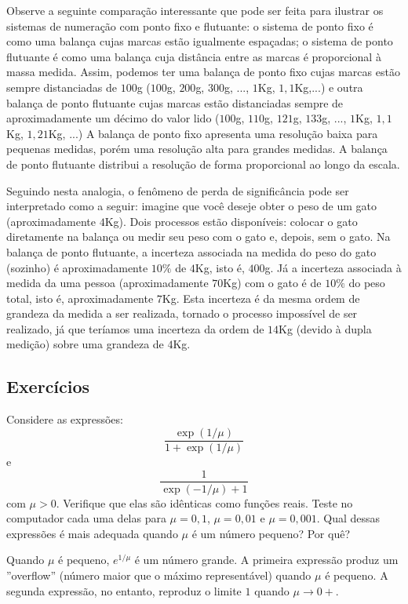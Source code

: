 \begin{ex} Observe a seguinte comparação interessante que pode ser feita para ilustrar os sistemas de numeração com ponto fixo e flutuante: o sistema de ponto fixo é como uma balança cujas marcas estão igualmente espaçadas; o sistema de ponto flutuante é como uma balança cuja distância entre as marcas é proporcional à massa medida. Assim, podemos ter uma balança de ponto fixo cujas marcas estão sempre distanciadas de $100$g ($100$g, $200$g, $300$g, ..., $1$Kg, $1,1$Kg,...) e outra balança de ponto flutuante cujas marcas estão distanciadas sempre de aproximadamente um décimo do valor lido ($100$g, $110$g, $121$g, $133$g, ..., $1$Kg, $1,1$Kg, $1,21$Kg, ...) A balança de ponto fixo apresenta uma resolução baixa para pequenas medidas, porém uma resolução alta para grandes medidas. A balança de ponto flutuante distribui a resolução de forma proporcional ao longo da escala.    

Seguindo nesta analogia, o fenômeno de perda de significância pode ser interpretado como a seguir: imagine que você deseje obter o peso de um gato (aproximadamente $4$Kg). Dois processos estão disponíveis: colocar o gato diretamente na balança ou medir seu peso com o gato e, depois, sem o gato. Na balança de ponto flutuante, a incerteza associada na medida do peso do gato (sozinho) é aproximadamente $10\%$ de $4$Kg, isto é, $400$g. Já a incerteza associada à medida da uma pessoa (aproximadamente $70$Kg) com o gato é de $10\%$ do peso total, isto é, aproximadamente $7$Kg. Esta incerteza é da mesma ordem de grandeza da medida a ser realizada, tornado o processo impossível de ser realizado, já que teríamos uma incerteza da ordem de $14$Kg (devido à dupla medição) sobre uma grandeza de $4$Kg.    
\end{ex}

\subsection*{Exercícios}

\begin{exer} Considere as expressões:
  \begin{equation*}
    \frac{\exp(1/\mu)}{1+\exp(1/\mu)}  
  \end{equation*}
e
\begin{equation*}
  \frac{1}{\exp(-1/\mu)+1}
\end{equation*}
com $\mu>0$. Verifique que elas são idênticas como funções reais. Teste no computador cada uma delas para $\mu=0,1$, $\mu=0,01$ e $\mu=0,001$. Qual dessas expressões é mais adequada quando $\mu$ é um número pequeno? Por quê?
\end{exer}
\begin{resp}
  
  Quando $\mu$ é pequeno, $e^{1/\mu}$ é um número grande. A primeira expressão produz um ''overflow'' (número maior que o máximo representável) quando $\mu$ é pequeno. A segunda expressão, no entanto, reproduz o limite $1$ quando $\mu\to 0+$.
  
\end{resp}

